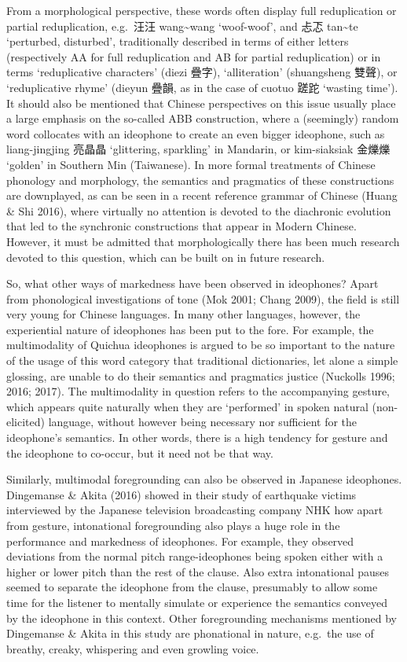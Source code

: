 \documentclass[12pt,article,oneside]{memoir}
\theoremstyle{definition}
\theoremstyle{definition}
\theoremstyle{definition}
\theoremstyle{remark}
\begin{document}
From a morphological perspective, these words often display full
reduplication or partial reduplication, e.g.~汪汪
wang\textasciitilde{}wang `woof-woof', and 忐忑 tan\textasciitilde{}te
`perturbed, disturbed', traditionally described in terms of either
letters (respectively AA for full reduplication and AB for partial
reduplication) or in terms `reduplicative characters' (diezi 疊字),
`alliteration' (shuangsheng 雙聲), or `reduplicative rhyme' (dieyun
疊韻, as in the case of cuotuo 蹉跎 `wasting time'). It should also be
mentioned that Chinese perspectives on this issue usually place a large
emphasis on the so-called ABB construction, where a (seemingly) random
word collocates with an ideophone to create an even bigger ideophone,
such as liang-jingjing 亮晶晶 `glittering, sparkling' in Mandarin, or
kim-siaksiak 金爍爍 `golden' in Southern Min (Taiwanese). In more formal
treatments of Chinese phonology and morphology, the semantics and
pragmatics of these constructions are downplayed, as can be seen in a
recent reference grammar of Chinese (Huang \& Shi 2016), where virtually
no attention is devoted to the diachronic evolution that led to the
synchronic constructions that appear in Modern Chinese. However, it must
be admitted that morphologically there has been much research devoted to
this question, which can be built on in future research.

So, what other ways of markedness have been observed in ideophones?
Apart from phonological investigations of tone (Mok 2001; Chang 2009),
the field is still very young for Chinese languages. In many other
languages, however, the experiential nature of ideophones has been put
to the fore. For example, the multimodality of Quichua ideophones is
argued to be so important to the nature of the usage of this word
category that traditional dictionaries, let alone a simple glossing, are
unable to do their semantics and pragmatics justice (Nuckolls 1996;
2016; 2017). The multimodality in question refers to the accompanying
gesture, which appears quite naturally when they are `performed' in
spoken natural (non-elicited) language, without however being necessary
nor sufficient for the ideophone's semantics. In other words, there is a
high tendency for gesture and the ideophone to co-occur, but it need not
be that way.

Similarly, multimodal foregrounding can also be observed in Japanese
ideophones. Dingemanse \& Akita (2016) showed in their study of
earthquake victims interviewed by the Japanese television broadcasting
company NHK how apart from gesture, intonational foregrounding also
plays a huge role in the performance and markedness of ideophones. For
example, they observed deviations from the normal pitch range-ideophones
being spoken either with a higher or lower pitch than the rest of the
clause. Also extra intonational pauses seemed to separate the ideophone
from the clause, presumably to allow some time for the listener to
mentally simulate or experience the semantics conveyed by the ideophone
in this context. Other foregrounding mechanisms mentioned by Dingemanse
\& Akita in this study are phonational in nature, e.g.~the use of
breathy, creaky, whispering and even growling voice.
\end{document}
